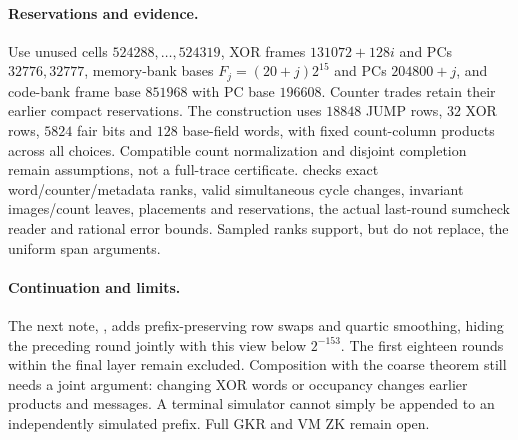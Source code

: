 \documentclass[11pt]{article}
\begin{document}
\paragraph{Reservations and evidence.} Use unused cells $524288,\ldots,524319$, XOR frames $131072+128i$ and PCs $32776,32777$, memory-bank bases $F_j=(20+j)2^{15}$ and PCs $204800+j$, and code-bank frame base $851968$ with PC base $196608$. Counter trades retain their earlier compact reservations. The construction uses $18848$ JUMP rows, $32$ XOR rows, $5824$ fair bits and $128$ base-field words, with fixed count-column products across all choices. Compatible count normalization and disjoint completion remain assumptions, not a full-trace certificate.  checks exact word/counter/metadata ranks, valid simultaneous cycle changes, invariant images/count leaves, placements and reservations, the actual last-round sumcheck reader and rational error bounds. Sampled ranks support, but do not replace, the uniform span arguments.

\paragraph{Continuation and limits.} The next note, , adds prefix-preserving row swaps and quartic smoothing, hiding the preceding round jointly with this view below $2^{-153}$. The first eighteen rounds within the final layer remain excluded. Composition with the coarse theorem still needs a joint argument: changing XOR words or occupancy changes earlier products and messages. A terminal simulator cannot simply be appended to an independently simulated prefix. Full GKR and VM ZK remain open.
\end{document}
